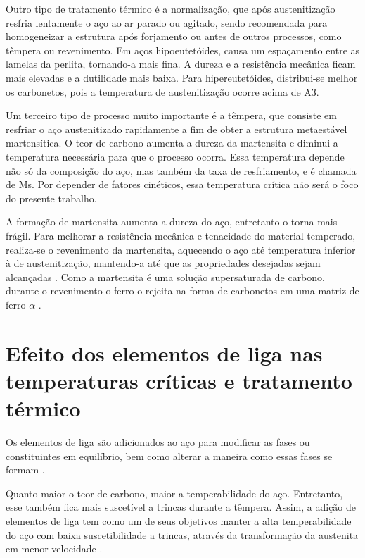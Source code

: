 \documentclass[brazil,tf,epusp]{usp}  %
\begin{document}
Outro tipo de tratamento térmico é a normalização, que após austenitização resfria lentamente o aço ao ar parado ou agitado, sendo recomendada para homogeneizar a estrutura após forjamento ou antes de outros processos, como têmpera ou revenimento. Em aços hipoeutetóides, causa um espaçamento entre as lamelas da perlita, tornando-a mais fina. A dureza e a resistência mecânica ficam mais elevadas e a dutilidade mais baixa. Para hipereutetóides, distribui-se melhor os carbonetos, pois a temperatura de austenitização ocorre acima de A3.

Um terceiro tipo de processo muito importante é a têmpera, que consiste em resfriar o aço austenitizado rapidamente a fim de obter a estrutura metaestável martensítica. O teor de carbono aumenta a dureza da martensita e diminui a temperatura necessária para que o processo ocorra. Essa temperatura depende não só da composição do aço, mas também da taxa de resfriamento, e é chamada de Ms. Por depender de fatores cinéticos, essa temperatura crítica não será o foco do presente trabalho.

A formação de martensita aumenta a dureza do aço, entretanto o torna mais frágil. Para  melhorar a resistência mecânica e tenacidade do material temperado, realiza-se o revenimento da martensita, aquecendo o aço até temperatura inferior à de austenitização, mantendo-a até que as propriedades desejadas sejam alcançadas \cite{Silva2010}. Como a martensita é uma solução supersaturada de carbono, durante o revenimento o ferro o rejeita na forma de carbonetos em uma matriz de ferro $\alpha$ \cite{Honeycombe1982}.

\section{Efeito dos elementos de liga nas temperaturas críticas e tratamento térmico}
Os elementos de liga são adicionados ao aço para modificar as fases ou constituintes em equilíbrio, bem como alterar a maneira como essas fases se formam \cite{Silva2010}.

Quanto maior o teor de carbono, maior a temperabilidade do aço. Entretanto, esse também fica mais suscetível a trincas durante a têmpera. Assim, a adição de elementos de liga tem como um de seus objetivos manter a alta temperabilidade do aço com baixa suscetibilidade a trincas, através da transformação da austenita em menor velocidade \cite{Souza1989}.
\end{document}
